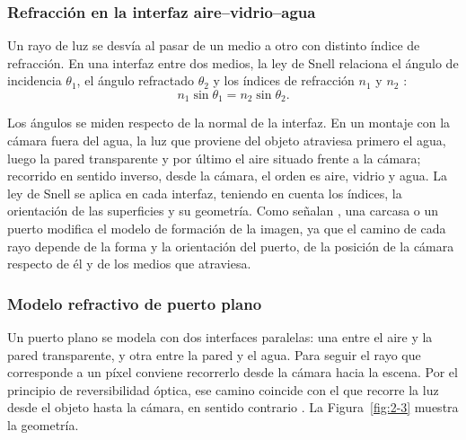 \subsubsection{Refracción en la interfaz aire--vidrio--agua}

Un rayo de luz se desvía al pasar de un medio a otro con distinto índice de refracción. En una interfaz entre dos medios, la ley de Snell relaciona el ángulo de incidencia $\theta_1$, el ángulo refractado $\theta_2$ y los índices de refracción $n_1$ y $n_2$ \parencite{Hecht2017}:
\begin{equation}
n_1 \sin\theta_1 = n_2 \sin\theta_2 .
\label{eq:snell}
\end{equation}

Los ángulos se miden respecto de la normal de la interfaz. En un montaje con la cámara fuera del agua, la luz que proviene del objeto atraviesa primero el agua, luego la pared transparente y por último el aire situado frente a la cámara; recorrido en sentido inverso, desde la cámara, el orden es aire, vidrio y agua. La ley de Snell se aplica en cada interfaz, teniendo en cuenta los índices, la orientación de las superficies y su geometría. Como señalan \textcite{Seegraber2025}, una carcasa o un puerto modifica el modelo de formación de la imagen, ya que el camino de cada rayo depende de la forma y la orientación del puerto, de la posición de la cámara respecto de él y de los medios que atraviesa.

\subsubsection{Modelo refractivo de puerto plano}
\label{sec:puerto-plano}

Un puerto plano se modela con dos interfaces paralelas: una entre el aire y la pared transparente, y otra entre la pared y el agua. Para seguir el rayo que corresponde a un píxel conviene recorrerlo desde la cámara hacia la escena. Por el principio de reversibilidad óptica, ese camino coincide con el que recorre la luz desde el objeto hasta la cámara, en sentido contrario \parencite{Agrawal2012,JordtSedlazeck2012}. La Figura~\ref{fig:2-3} muestra la geometría.

